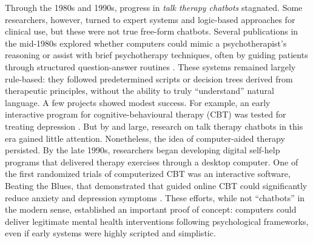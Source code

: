 Through the 1980s and 1990s, progress in \emph{talk therapy chatbots} stagnated. Some researchers, however, turned to expert systems and logic-based approaches for clinical use, but these were not true free-form chatbots. Several publications in the mid-1980s explored whether computers could mimic a psychotherapist's reasoning or assist with brief psychotherapy techniques, often by guiding patients through structured question-answer routines \cite{Hartman1986,Sampson1986,ServanSchreiber1986}. These systems remained largely rule-based: they followed predetermined scripts or decision trees derived from therapeutic principles, without the ability to truly ``understand'' natural language. A few projects showed modest success. For example, an early interactive program for cognitive-behavioural therapy (CBT) was tested for treating depression \cite{Selmi1990}. But by and large, research on talk therapy chatbots in this era gained little attention. Nonetheless, the idea of computer-aided therapy persisted. By the late 1990s, researchers began developing digital self-help programs that delivered therapy exercises through a desktop computer. One of the first randomized trials of computerized CBT was an interactive software, Beating the Blues, that demonstrated that guided online CBT could significantly reduce anxiety and depression symptoms \cite{Proudfoot2003}. These efforts, while not ``chatbots'' in the modern sense, established an important proof of concept: computers could deliver legitimate mental health interventions following psychological frameworks, even if early systems were highly scripted and simplistic.


